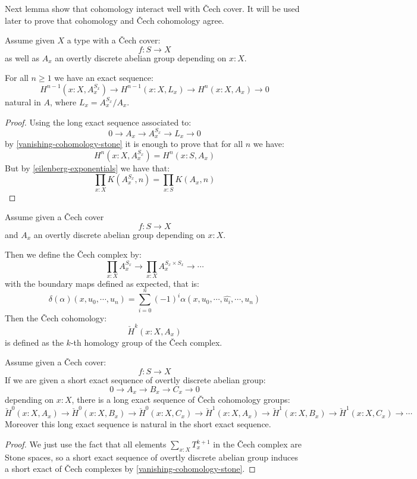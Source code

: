 Next lemma show that cohomology interact well with \v{C}ech cover. It will be used later to prove that cohomology and \v{C}ech cohomology agree.

\begin{lemma}\label{inductive-definition-cohomology}
Assume given $X$ a type with a \v{C}ech cover:
\[f:S\to X\]
as well as $A_x$ an overtly discrete abelian group depending on $x:X$.

For all $n\geq 1$ we have an exact sequence:
\[H^{n-1}(x:X,A_x^{S_x}) \to H^{n-1}(x:X,L_x)\to H^n(x:X,A_x)\to 0\]
natural in $A$, where $L_x = A_x^{S_x}/A_x$.
\end{lemma}

\begin{proof}
Using the long exact sequence associated to:
\[0\to A_x\to A_x^{S_x}\to L_x\to 0\]
by \cref{vanishing-cohomology-stone} it is enough to prove that for all $n$ we have:
\[H^n(x:X,A_x^{S_x}) = H^n(x:S,A_x)\]
But by \cref{eilenberg-exponentials} we have that:
\[\prod_{x:X}K(A_x^{S_x},n) = \prod_{x:S}K(A_x,n)\]
\end{proof}

\begin{definition}
Assume given a \v{C}ech cover
\[f:S\to X\]
and $A_x$ an overtly discrete abelian group depending on $x:X$.

Then we define the \v{C}ech complex by:
\[\prod_{x:X}A_x^{S_x} \to \prod_{x:X}A_x^{S_x\times S_x} \to \cdots\]
with the boundary maps defined as expected, that is:
\[\delta(\alpha)(x,u_0,\cdots,u_n) = \sum_{i=0}^n (-1)^i\alpha(x,u_0,\cdots,\hat{u_i},\cdots,u_n)\]
Then the \v{C}ech cohomology:
\[\check{H}^k(x:X,A_x)\]
is defined as the $k$-th homology group of the \v{C}ech complex.
\end{definition}

\begin{lemma}
Assume given a \v{C}ech cover:
\[f:S\to X\]
If we are given a short exact sequence of overtly discrete abelian group:
\[0\to A_x\to B_x\to C_x\to 0\]
depending on $x:X$, there is a long exact sequence of \v{C}ech cohomology groups:
\[\check{H}^0(x:X,A_x) \to\check{H}^0(x:X,B_x) \to\check{H}^0(x:X,C_x) \to\check{H}^1(x:X,A_x) \to\check{H}^1(x:X,B_x) \to\check{H}^1(x:X,C_x) \to\cdots \]
Moreover this long exact sequence is natural in the short exact sequence.
\end{lemma}

\begin{proof}
We just use the fact that all elements $\sum_{x:X} T_x^{k+1}$ in the \v{C}ech complex are Stone spaces, so a short exact sequence of overtly discrete abelian group induces a short exact of \v{C}ech complexes by \cref{vanishing-cohomology-stone}.
\end{proof}

